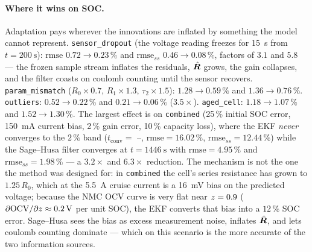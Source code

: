 \paragraph{Where it wins on SOC.}  Adaptation pays wherever the innovations are inflated by something
the model cannot represent.  \texttt{sensor\_dropout} (the voltage reading freezes for
\SI{15}{\second} from $t=\SI{200}{\second}$): $\mathrm{rmse}$ $0.72\to0.23\,\%$ and
$\mathrm{rmse}_{ss}$ $0.46\to0.08\,\%$, factors of $3.1$ and $5.8$ --- the frozen sample stream
inflates the residuals, $\hat{\bm{R}}$ grows, the gain collapses, and the filter coasts on coulomb
counting until the sensor recovers.  \texttt{param\_mismatch} ($R_0\times0.7$, $R_1\times1.3$,
$\tau_2\times1.5$): $1.28\to0.59\,\%$ and $1.36\to0.76\,\%$.  \texttt{outliers}:
$0.52\to0.22\,\%$ and $0.21\to0.06\,\%$ ($3.5\times$).  \texttt{aged\_cell}: $1.18\to1.07\,\%$ and
$1.52\to1.30\,\%$.  The largest effect is on \texttt{combined} (25\,\% initial SOC error,
\SI{150}{\milli\ampere} current bias, 2\,\% gain error, 10\,\% capacity loss), where the EKF
\emph{never} converges to the $2\,\%$ band ($t_\mathrm{conv}=$ --, $\mathrm{rmse}=16.02\,\%$,
$\mathrm{rmse}_{ss}=12.44\,\%$) while the Sage--Husa filter converges at $t=\SI{1446}{\second}$ with
$\mathrm{rmse}=4.95\,\%$ and $\mathrm{rmse}_{ss}=\mathbf{1.98\,\%}$ --- a $3.2\times$ and
$6.3\times$ reduction.  The mechanism is not the one the method was designed for: in
\texttt{combined} the cell's series resistance has grown to $1.25\,R_0$, which at the
\SI{5.5}{\ampere} cruise current is a \SI{16}{\milli\volt} bias on the predicted voltage; because the
NMC OCV curve is very flat near $z=0.9$ ($\partial\mathrm{OCV}/\partial z\approx\SI{0.2}{\volt}$ per
unit SOC), the EKF converts that bias into a $12\,\%$ SOC error.  Sage--Husa sees the bias as excess
measurement noise, inflates $\hat{\bm{R}}$, and lets coulomb counting dominate --- which on this
scenario is the more accurate of the two information sources.


